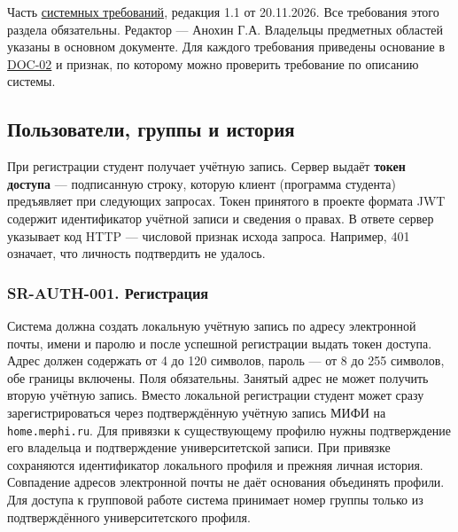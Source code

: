 \documentclass[12pt,a4paper]{article}
\begin{document}
Часть {\hyperlink{doc-05-системные-требования}{системных требований}}, редакция 1.1 от 20.11.2026. Все требования этого раздела обязательны. Редактор --- Анохин Г.А. Владельцы предметных областей указаны в основном документе. Для каждого требования приведены основание в {\href{../02\_Техническое\_задание/DOC-02\_Техническое\_задание.pdf\#doc-02-техническое-задание}{DOC-02}} и признак, по которому можно проверить требование по описанию системы.

\subsection{Пользователи, группы и история}\label{ux43fux43eux43bux44cux437ux43eux432ux430ux442ux435ux43bux438-ux433ux440ux443ux43fux43fux44b-ux438-ux438ux441ux442ux43eux440ux438ux44f}

\hypertarget{пользователи-группы-и-история}{}

При регистрации студент получает учётную запись. Сервер выдаёт \textbf{токен доступа} --- подписанную строку, которую клиент (программа студента) предъявляет при следующих запросах. Токен принятого в проекте формата JWT содержит идентификатор учётной записи и сведения о правах. В ответе сервер указывает код HTTP --- числовой признак исхода запроса. Например, 401 означает, что личность подтвердить не удалось.

\subsubsection{SR-AUTH-001. Регистрация}\label{sr-auth-001-ux440ux435ux433ux438ux441ux442ux440ux430ux446ux438ux44f}

\hypertarget{sr-auth-001-регистрация}{}

\hypertarget{sr-auth-001}{}

Система должна создать локальную учётную запись по адресу электронной почты, имени и паролю и после успешной регистрации выдать токен доступа. Адрес должен содержать от 4 до 120 символов, пароль --- от 8 до 255 символов, обе границы включены. Поля обязательны. Занятый адрес не может получить вторую учётную запись. Вместо локальной регистрации студент может сразу зарегистрироваться через подтверждённую учётную запись МИФИ на \texttt{home.\allowbreak{}mephi.\allowbreak{}ru}. Для привязки к существующему профилю нужны подтверждение его владельца и подтверждение университетской записи. При привязке сохраняются идентификатор локального профиля и прежняя личная история. Совпадение адресов электронной почты не даёт основания объединять профили. Для доступа к групповой работе система принимает номер группы только из подтверждённого университетского профиля.
\end{document}
